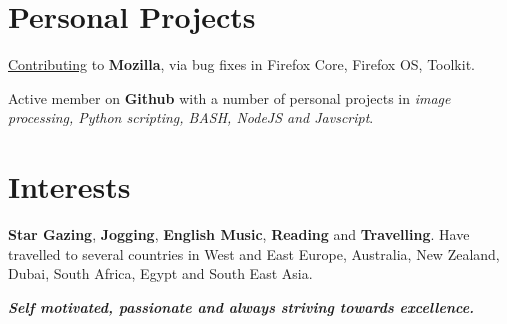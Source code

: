 \documentclass[11pt]{resume}
\begin{document}
\begin{resume}


\section{\mysidestyle Personal Projects}

\begin{list2}
\item \href{httpss://bugzilla.mozilla.org/user_profile?login=kalpeshk2011\%40gmail.com}{Contributing} to \textbf{Mozilla}, via bug fixes in Firefox Core, Firefox OS, Toolkit.
\item Active member on \textbf{Github} with a number of personal projects in \textsl{image processing, Python scripting, BASH, NodeJS and Javscript}.

\end{list2}
\section{\mysidestyle Interests} \textbf{Star Gazing}, \textbf{Jogging}, \textbf{English Music}, \textbf{Reading} and \textbf{Travelling}. Have travelled to several countries in West and East Europe, Australia, New Zealand, Dubai, South Africa, Egypt and South East Asia.

\textit{\textbf{Self motivated, passionate and always striving towards excellence.}}




    

\end{resume}
\end{document}
